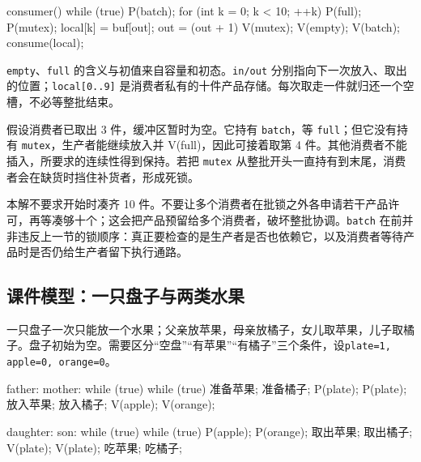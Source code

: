 \par\medskip\noindent\begin{minipage}{\linewidth}
\begin{codeblock}[language={}]
consumer() {
    while (true) {
        P(batch);
        for (int k = 0; k < 10; ++k) {
            P(full);
            P(mutex);
            local[k] = buf[out];
            out = (out + 1) %
            V(mutex);
            V(empty);
        }
        V(batch);
        consume(local);
    }
}
\end{codeblock}
\end{minipage}\par\medskip

\texttt{empty}、\texttt{full} 的含义与初值来自容量和初态。\texttt{in/\allowbreak{}out} 分别指向下一次放入、取出的位置；\texttt{local[\allowbreak{}0.\allowbreak{}.\allowbreak{}9]\allowbreak{}} 是消费者私有的十件产品存储。每次取走一件就归还一个空槽，不必等整批结束。

假设消费者已取出 3 件，缓冲区暂时为空。它持有 \texttt{batch}，等 \texttt{full}；但它没有持有 \texttt{mutex}，生产者能继续放入并 V(full)，因此可接着取第 4 件。其他消费者不能插入，所要求的连续性得到保持。若把 \texttt{mutex} 从整批开头一直持有到末尾，消费者会在缺货时挡住补货者，形成死锁。

本解不要求开始时凑齐 10 件。不要让多个消费者在批锁之外各申请若干产品许可，再等凑够十个；这会把产品预留给多个消费者，破坏整批协调。\texttt{batch} 在前并非违反上一节的锁顺序：真正要检查的是生产者是否也依赖它，以及消费者等待产品时是否仍给生产者留下执行通路。

\subsection{课件模型：一只盘子与两类水果}\label{OS02-fruit}

一只盘子一次只能放一个水果；父亲放苹果，母亲放橘子，女儿取苹果，儿子取橘子。盘子初始为空。需要区分``空盘''``有苹果''``有橘子''三个条件，设\texttt{plate=\allowbreak{}1,\allowbreak{} apple=\allowbreak{}0,\allowbreak{} orange=\allowbreak{}0}。

\par\medskip\noindent\begin{minipage}{\linewidth}
\begin{codeblock}[language={}]
father:                       mother:
while (true) {                while (true) {
    准备苹果;                     准备橘子;
    P(plate);                    P(plate);
    放入苹果;                     放入橘子;
    V(apple);                    V(orange);
}                             }

daughter:                     son:
while (true) {                while (true) {
    P(apple);                    P(orange);
    取出苹果;                     取出橘子;
    V(plate);                    V(plate);
    吃苹果;                       吃橘子;
}                             }
\end{codeblock}
\end{minipage}\par\medskip

